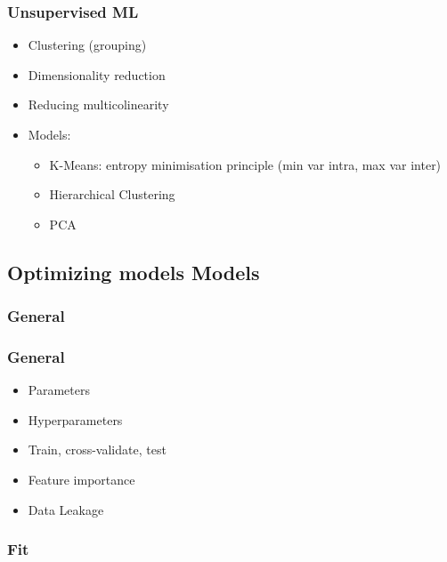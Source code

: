 \begin{frame}\frametitle{Unsupervised ML}
   \begin{itemize}
      \item Clustering (grouping)
      \item Dimensionality reduction
      \item Reducing multicolinearity
      \item Models:
      \begin{itemize}
         \item K-Means: entropy minimisation principle (min var intra, max var inter)
         \item Hierarchical Clustering
         \item PCA
      \end{itemize}
   \end{itemize}
\end{frame}




\subsection{Optimizing models Models}

\subsubsection{General}

\begin{frame}\frametitle{General}
   \begin{itemize}
      \item Parameters
      \item Hyperparameters
      \item Train, cross-validate, test
      \item Feature importance
      \item Data Leakage
   \end{itemize}
\end{frame}


\subsubsection{Fit}

